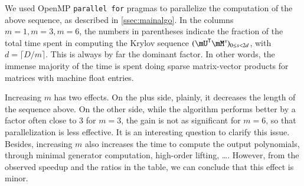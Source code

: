 \documentclass[final,1p,times,authoryear]{elsarticle}
\newcommand{\trsp}[1]{#1^{\mathsf{T}}} %
\newcommand{\mUt}{\trsp{\mU}}
\begin{document}
We used OpenMP {\tt parallel
for} pragmas to parallelize the computation of the above sequence,
as described in \cref{ssec:mainalgo}.
In the columns $m=1,m=3,m=6$, the numbers in parentheses indicate the
fraction of the total time spent in computing the Krylov sequence
$(\mUt \mM^s)_{0 \le s< 2d}$, with $d=\lceil D/m\rceil$. This is
always by far the dominant factor.  In other words, the immense
majority of the time is spent doing sparse matrix-vector products
for matrices with machine float entries. 

Increasing $m$ has two effects. On the plus side, plainly, it
decreases the length of the sequence above. On the other side, while
the algorithm performs better by a factor often close to 3 for $m=3$,
the gain is not as significant for $m=6$, so that parallelization is
less effective. It is an interesting question to clarify this issue.  Besides, increasing $m$ also increases the time to
compute the output polynomials, through minimal generator computation,
high-order lifting, \dots. However, from the observed speedup and the
ratios in the table, we can conclude that this effect is minor.
\end{document}
